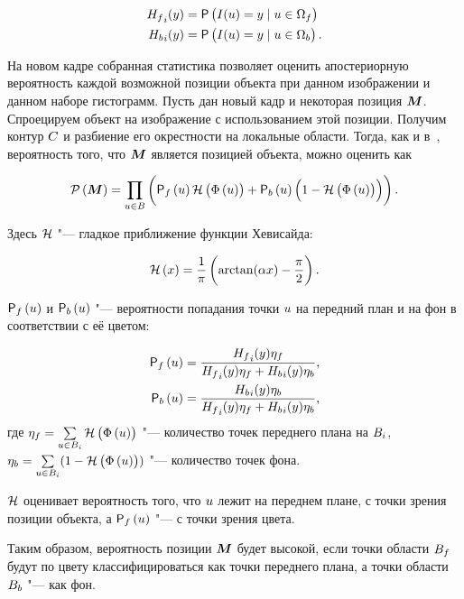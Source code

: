 \begin{align}
\label{eqn:H_f_Y}
    {\ensuremath{H_f}}_i(y) &= \mathsf{P} \left( I(\mathnormal{u}) = y \mid \mathnormal{u} \in \Omega_f \right) \\
    {H_b}_i(y) &= \mathsf{P} \left( I(\mathnormal{u}) = y \mid \mathnormal{u} \in \Omega_b \right)
\text{.}
\end{align}

На новом кадре собранная статистика позволяет оценить апостериорную вероятность
каждой возможной позиции объекта при данном изображении и данном наборе
гистограмм.
Пусть дан новый кадр и некоторая позиция $\bm{M}$.
Спроецируем объект на изображение с использованием этой позиции.
Получим контур $C$ и разбиение его окрестности на локальные области.
Тогда, как и в~\cite{Hexner2016}, вероятность того, что $\bm{M}$ является
позицией объекта, можно оценить как

\begin{equation}
\label{eqn:pos_prob}
    \mathcal{P} \left( \bm{M} \right)  = \prod\limits_{\mathnormal{u} \in B} \left(
        \mathsf{P}_f \left( \mathnormal{u} \right) \mathcal{H} \left( \Phi \left( \mathnormal{u} \right) \right)
        + \mathsf{P}_b \left( \mathnormal{u} \right) \left( 1 - \mathcal{H} \left( \Phi \left( \mathnormal{u} \right) \right) \right)
    \right)
\text{.}
\end{equation}

Здесь $\mathcal{H}$ "--- гладкое приближение функции Хевисайда:

\begin{equation}
\label{eqn:heaviside}
    \mathcal{H} \left( x \right) = \frac{1}{\pi} \left( \arctan(\alpha x) - \frac{\pi}{2} \right)
\text{.}
\end{equation}

$\mathsf{P}_f \left( \mathnormal{u} \right)$ и $\mathsf{P}_b \left( \mathnormal{u} \right)$ "--- вероятности попадания точки $\mathnormal{u}$ на
передний план и на фон в соответствии с её цветом:

\begin{align}
\label{eqn:Pfu}
    \mathsf{P}_f \left( \mathnormal{u} \right) &= \frac{{H_f}_i(y)\eta_f}{{H_f}_i(y)\eta_f +
        {H_b}_i(y)\eta_b} \text{,} \\
    \mathsf{P}_b \left( \mathnormal{u} \right) &=\frac{{H_b}_i(y)\eta_b}{{H_f}_i(y)\eta_f +
        {H_b}_i(y)\eta_b} \text{,}
\end{align}
где
$
    \eta_f = \sum\limits_{\mathnormal{u} \in B_i}\mathcal{H} \left( \Phi \left( \mathnormal{u} \right) \right)
$ "--- количество точек переднего плана на $B_i$,
$
    \eta_b = \sum\limits_{\mathnormal{u} \in B_i}(1 - \mathcal{H} \left( \Phi \left( \mathnormal{u} \right) \right))
$ "--- количество точек фона.

$\mathcal{H}$ оценивает вероятность того, что $\mathnormal{u}$ лежит на переднем плане, с точки
зрения позиции объекта, а $\mathsf{P}_f \left( \mathnormal{u} \right)$ "--- с точки зрения цвета.

Таким образом, вероятность позиции $\bm{M}$ будет высокой, если точки области
$B_f$ будут по цвету классифицироваться как точки переднего плана, а
точки области $B_b$ "--- как фон.

